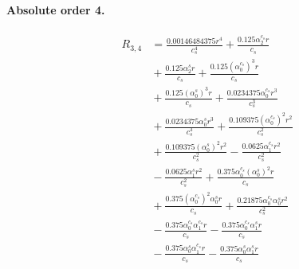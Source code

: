 \documentclass[10pt]{article}
\begin{document}
\paragraph{Absolute order 4.}
\begin{align*}
R_{3,4} &= \frac{0.00146484375 r^{4}}{c_{s}^{4}} + \frac{0.125 \alpha_{2}^{c_s} r}{c_{s}} \\
&{}  + \frac{0.125 \alpha_{2}^s r}{c_{s}} + \frac{0.125 \left(\alpha_{0}^{c_s}\right)^{3} r}{c_{s}} \\
&{}  + \frac{0.125 \left(\alpha_{0}^s\right)^{3} r}{c_{s}} + \frac{0.0234375 \alpha_{0}^{c_s} r^{3}}{c_{s}^{3}} \\
&{}  + \frac{0.0234375 \alpha_{0}^s r^{3}}{c_{s}^{3}} + \frac{0.109375 \left(\alpha_{0}^{c_s}\right)^{2} r^{2}}{c_{s}^{2}} \\
&{}  + \frac{0.109375 \left(\alpha_{0}^s\right)^{2} r^{2}}{c_{s}^{2}} - \frac{0.0625 \alpha_{1}^{c_s} r^{2}}{c_{s}^{2}} \\
&{}  - \frac{0.0625 \alpha_{1}^s r^{2}}{c_{s}^{2}} + \frac{0.375 \alpha_{0}^{c_s} \left(\alpha_{0}^s\right)^{2} r}{c_{s}} \\
&{}  + \frac{0.375 \left(\alpha_{0}^{c_s}\right)^{2} \alpha_{0}^s r}{c_{s}} + \frac{0.21875 \alpha_{0}^{c_s} \alpha_{0}^s r^{2}}{c_{s}^{2}} \\
&{}  - \frac{0.375 \alpha_{0}^{c_s} \alpha_{1}^{c_s} r}{c_{s}} - \frac{0.375 \alpha_{0}^{c_s} \alpha_{1}^s r}{c_{s}} \\
&{}  - \frac{0.375 \alpha_{0}^s \alpha_{1}^{c_s} r}{c_{s}} - \frac{0.375 \alpha_{0}^s \alpha_{1}^s r}{c_{s}}
\end{align*}
\end{document}
